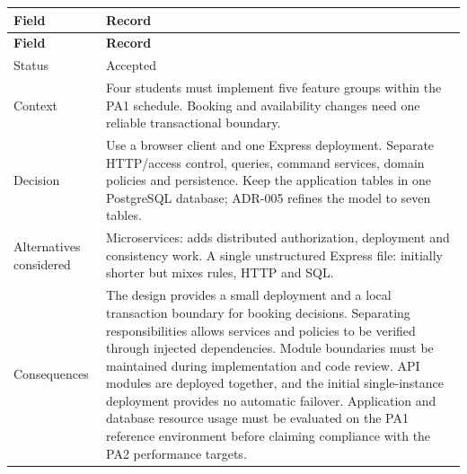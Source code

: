 \begin{longtable}{|p{}|p{}|}

\hline

\textbf{Field} & \textbf{Record} \\ \hline

\endfirsthead

\hline

\textbf{Field} & \textbf{Record} \\ \hline

\endhead

Status & Accepted \\ \hline

Context & Four students must implement five feature groups within the PA1 schedule.\allowbreak{} Booking and availability changes need one reliable transactional boundary.\allowbreak{} \\ \hline

Decision & Use a browser client and one Express deployment.\allowbreak{} Separate HTTP/\allowbreak{}access control, queries, command services, domain policies and persistence.\allowbreak{} Keep the application tables in one Postgre\allowbreak{}SQL database; ADR-\allowbreak{}005 refines the model to seven tables.\allowbreak{} \\ \hline

Alternatives considered & Microservices: adds distributed authorization, deployment and consistency work.\allowbreak{} A single unstructured Express file: initially shorter but mixes rules, HTTP and SQL.\allowbreak{} \\ \hline

Consequences & The design provides a small deployment and a local transaction boundary for booking decisions.\allowbreak{} Separating responsibilities allows services and policies to be verified through injected dependencies.\allowbreak{} Module boundaries must be maintained during implementation and code review.\allowbreak{} API modules are deployed together, and the initial single-\allowbreak{}instance deployment provides no automatic failover.\allowbreak{} Application and database resource usage must be evaluated on the PA1 reference environment before claiming compliance with the PA2 performance targets.\allowbreak{} \\ \hline

\end{longtable}

\vspace{2mm}

